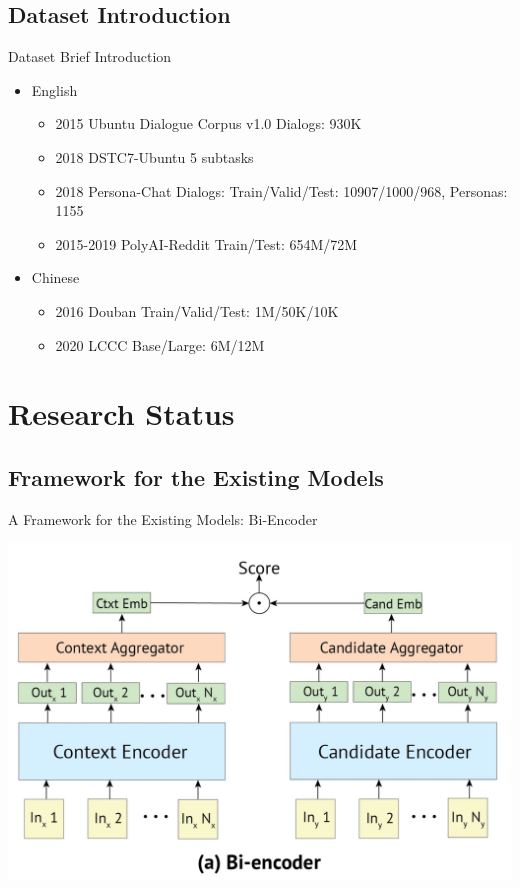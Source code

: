 \documentclass{beamer}
\begin{document}
\subsection{Dataset Introduction}
\begin{frame}{Dataset Brief Introduction}
    \begin{itemize}
        \item English
        \begin{itemize}
            \item 2015 Ubuntu Dialogue Corpus v1.0 Dialogs: 930K
            \item 2018 DSTC7-Ubuntu 5 subtasks
            \item 2018 Persona-Chat  Dialogs: Train/Valid/Test: 10907/1000/968, Personas: 1155
            \item 2015-2019 PolyAI-Reddit Train/Test: 654M/72M
        \end{itemize}
        \item Chinese
        \begin{itemize} 
            \item 2016 Douban Train/Valid/Test: 1M/50K/10K
            \item 2020 LCCC Base/Large: 6M/12M
        \end{itemize}
        
    \end{itemize}
\end{frame}


\section{Research Status}

\subsection{Framework for the Existing Models}


\begin{frame}{A Framework for the Existing Models: Bi-Encoder}
     \begin{center}
    \includegraphics[width=0.9\linewidth]{Bi-encoder.png}
     \end{center}
\end{frame}
\end{document}
